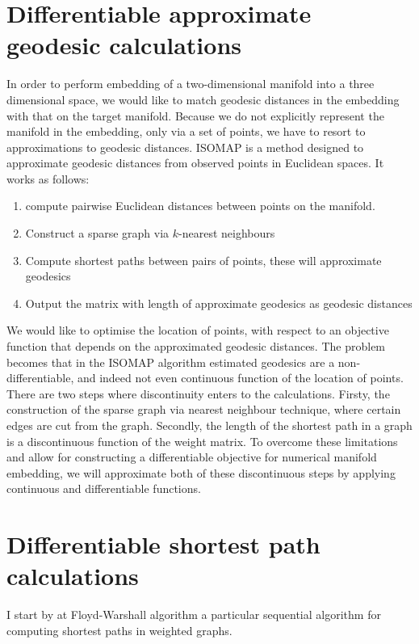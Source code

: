 \section{Differentiable approximate geodesic calculations}

In order to perform embedding of a two-dimensional manifold into a three dimensional space, we would like to match geodesic distances in the embedding with that on the target manifold. Because we do not explicitly represent the manifold in the embedding, only via a set of points, we have to resort to approximations to geodesic distances. ISOMAP \cite{Tenenbaum} is a method designed to approximate geodesic distances from observed points in Euclidean spaces. It works as follows:

\begin{enumerate}
	\item compute pairwise Euclidean distances between points on the manifold.
	\item Construct a sparse graph via $k$-nearest neighbours
	\item Compute shortest paths between pairs of points, these will approximate geodesics
	\item Output the matrix with length of approximate geodesics as geodesic distances
\end{enumerate}

We would like to optimise the location of points, with respect to an objective function that depends on the approximated geodesic distances. The problem becomes that in the ISOMAP algorithm estimated geodesics are a non-differentiable, and indeed not even continuous function of the location of points. There are two steps where discontinuity enters to the calculations. Firsty, the construction of the sparse graph via nearest neighbour technique, where certain edges are cut from the graph. Secondly, the length of the shortest path in a graph is a discontinuous function of the weight matrix. To overcome these limitations and allow for constructing a differentiable objective for numerical manifold embedding, we will approximate both of these discontinuous steps by applying continuous and differentiable functions.

\section{Differentiable shortest path calculations}

I start by  at Floyd-Warshall algorithm a particular sequential algorithm for computing shortest paths in weighted graphs.

